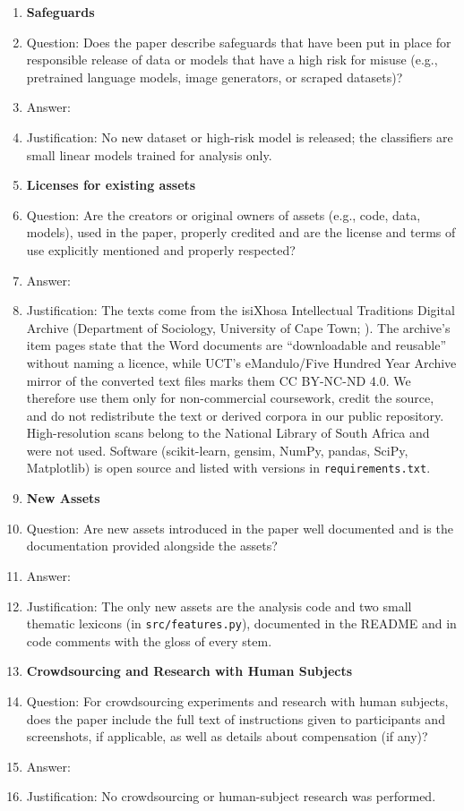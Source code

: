 \begin{enumerate}
\item {\bf Safeguards}
    \item[] Question: Does the paper describe safeguards that have been put in place for responsible release of data or models that have a high risk for misuse (e.g., pretrained language models, image generators, or scraped datasets)?
    \item[] Answer: \answerNA{}
    \item[] Justification: No new dataset or high-risk model is released; the classifiers are small linear models trained for analysis only.

\item {\bf Licenses for existing assets}
    \item[] Question: Are the creators or original owners of assets (e.g., code, data, models), used in the paper, properly credited and are the license and terms of use explicitly mentioned and properly respected?
    \item[] Answer: \answerYes{}
    \item[] Justification: The texts come from the isiXhosa Intellectual Traditions Digital Archive (Department of Sociology, University of Cape Town; \citealp{schoots2023isixhosa}). The archive's item pages state that the Word documents are ``downloadable and reusable'' without naming a licence, while UCT's eMandulo/Five Hundred Year Archive mirror of the converted text files marks them CC BY-NC-ND 4.0. We therefore use them only for non-commercial coursework, credit the source, and do not redistribute the text or derived corpora in our public repository. High-resolution scans belong to the National Library of South Africa and were not used. Software (scikit-learn, gensim, NumPy, pandas, SciPy, Matplotlib) is open source and listed with versions in \texttt{requirements.txt}.

\item {\bf New Assets}
    \item[] Question: Are new assets introduced in the paper well documented and is the documentation provided alongside the assets?
    \item[] Answer: \answerYes{}
    \item[] Justification: The only new assets are the analysis code and two small thematic lexicons (in \texttt{src/features.py}), documented in the README and in code comments with the gloss of every stem.

\item {\bf Crowdsourcing and Research with Human Subjects}
    \item[] Question: For crowdsourcing experiments and research with human subjects, does the paper include the full text of instructions given to participants and screenshots, if applicable, as well as details about compensation (if any)?
    \item[] Answer: \answerNA{}
    \item[] Justification: No crowdsourcing or human-subject research was performed.


\end{enumerate}
